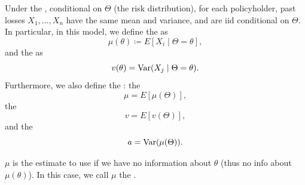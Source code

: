 \documentclass[notoc,notitlepage]{tufte-book}
\begin{document}
\begin{defn}\label{defn:the_buhlmann_model}
  Under the , conditional on $\Theta$ (the risk
  distribution), for each policyholder, past losses $X_1, \ldots, X_n$ have the
  same mean and variance, and are iid conditional on $\Theta$. In particular, in
  this model, we define the  as
  \begin{equation*}
    \mu(\theta) \coloneqq E[X_i \mid \Theta = \theta],
  \end{equation*}
  and the  as
  \begin{equation*}
    v(\theta) = \operatorname{Var}(X_j \mid \Theta = \theta).
  \end{equation*}
  Furthermore, we also define the : the
  \begin{equation*}
    \mu = E[\mu(\Theta)],
  \end{equation*}
  the 
  \begin{equation*}
    v = E[v(\Theta)],
  \end{equation*}
  and the 
  \begin{equation*}
    a = \operatorname{Var}(\mu(\Theta)).
  \end{equation*}
\end{defn}

\begin{note}
  $\mu$ is the estimate to use if we have no information about $\theta$ (thus no
  info about $\mu(\theta)$). In this case, we call $\mu$ the .
\end{note}
\end{document}

